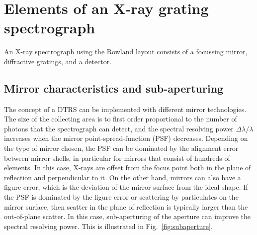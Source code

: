 \documentclass[linenumbers]{aastex631}
\begin{document}
\section{Elements of an X-ray grating spectrograph}
\label{sect:elements}
An X-ray spectrograph using the Rowland layout consists of a focussing mirror, diffractive gratings, and a detector.

\subsection{Mirror characteristics and sub-aperturing}
The concept of a DTRS can be implemented with different mirror technologies. The size of the collecting area is to first order proportional to the number of photons that the spectrograph can detect, and the spectral resolving power $\Delta \lambda / \lambda$ increases when the mirror point-spread-function (PSF) decreases. Depending on the type of mirror chosen, the PSF can be dominated by the alignment error between mirror shells, in particular for mirrors that consist of hundreds of elements. In this case, X-rays are offset from the focus point both in the plane of reflection and perpendicular to it.
On the other hand, mirrors can also have a figure error, which is the deviation of the mirror surface from the ideal shape. If the PSF is dominated by the figure error or scattering by particulates on the mirror surface, then scatter in the plane of reflection is typically larger than the out-of-plane scatter. In this case, sub-aperturing of the aperture can improve the spectral resolving power. This is illustrated in Fig.~\ref{fig:subaperture}.


\begin{figure*}
\caption{
    Illustration of the concept of sub-aperturing. All panels show a view from the universe looking down onto the telescope. \emph{left}: Each dot is a photon shown as it passes through a diffraction gratings. Photons are colored according to their polar angle in this panel. \emph{middle and right:} Photons detected in the zeroth and first diffraction order on the detector, respectively. The dispersion direction is from left to right ($y$ coordinate), the distance from the focal point at $(y, z) = (0, 0)$ is shown. Each photon is shown in the same color as in the left panel. Photons passing mirror and grating close to $z=0$ (dark purple) are spread out along the dispersion direction ($y$ coordinate); photons passing mirror and gratings close to $y=0$ are more concentrated along the dispersion direction. Sub-aperturing means that the mirror and gratings do not cover a full circle, but only regions marked in yellow and green in the left panel, so that the resulting photon distributions on the detector are narrower in dispersion direction. Sub-aperturing thus reduces the PSF in the dispersion direction, which increases the spectral resolving power.}
\label{fig:subaperture}
\end{figure*}
\end{document}
